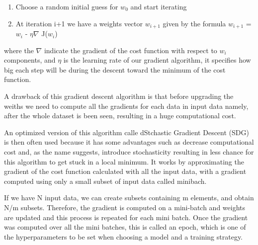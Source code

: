 \documentclass[a4paper,11pt]{article}
\begin{document}
\begin{enumerate}
\item Choose a random initial guess for \textbf{$w_0$} and start iterating
\item At iteration i+1 we have a weights vector \textbf{$w_{i+1}$} given by the formula \textbf{$w_{i+1}$} = \textbf{$w_i$} - $\eta \nabla$ J(\textbf{$w_i$})
\end{enumerate}

 where the $\nabla$ indicate the gradient of the cost function with respect to \textbf{$w_i$} components, and $\eta$ is the learning rate of our gradient algorithm, it specifies how big each step will be during the descent toward the minimum of the cost function.


A drawback of this gradient descent algorithm is that before upgrading the weiths we need to compute all the gradients for each data in input data namely, after the whole dataset is been seen, resulting in a huge computational cost.

An optimized version of this algorithm calle dStchastic Gradient Descent (SDG) is then often used because it has some advantages such as decrease computational cost and, as the name suggests, introduce stochasticity resulting in less chance for this algorithm to get stuck in a local minimum.
It works by approximating the gradient of the cost function calculated with all the input data, with a gradient computed using only a small subset of input data called minibach.

If we have N input data, we can create subsets containing m elements, and obtain N/m subsets.
Therefore, the gradient is computed on a mini-batch and weights are updated and this process is repeated for each mini batch.
Once the gradient was computed over all the mini batches, this is called an epoch, which is one of the hyperparameters to be set when choosing a model and a training strategy.

\end{document}

